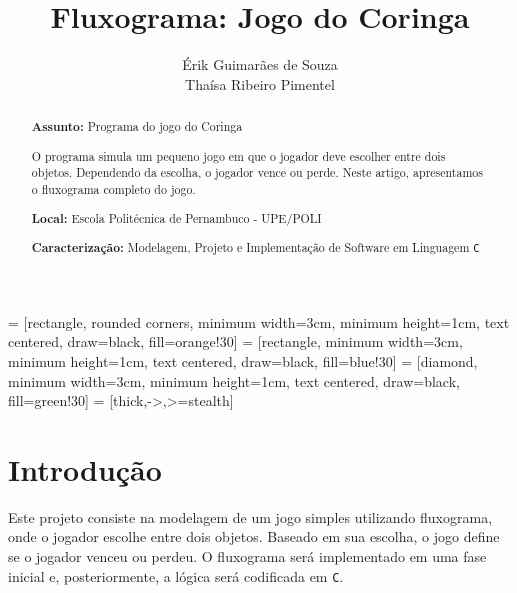 \documentclass[a4paper,12pt]{article} %
\title{Fluxograma: Jogo do Coringa}
\author{Érik Guimarães de Souza \\ Thaísa Ribeiro Pimentel}
\begin{document}
\maketitle

 = [rectangle, rounded corners, minimum width=3cm, minimum height=1cm, text centered, draw=black, fill=orange!30]
 = [rectangle, minimum width=3cm, minimum height=1cm, text centered, draw=black, fill=blue!30]
 = [diamond, minimum width=3cm, minimum height=1cm, text centered, draw=black, fill=green!30]
 = [thick,->,>=stealth]

\begin{abstract}

\textbf{Assunto:} Programa do jogo do Coringa

O programa simula um pequeno jogo em que o jogador deve escolher entre dois objetos. Dependendo da escolha, o jogador vence ou perde. Neste artigo, apresentamos o fluxograma completo do jogo.

\textbf{Local:} Escola Politécnica de Pernambuco - UPE/POLI

\textbf{Caracterização:} Modelagem, Projeto e Implementação de Software em Linguagem \texttt{C}

\end{abstract}

\section{Introdução}

Este projeto consiste na modelagem de um jogo simples utilizando fluxograma, onde o jogador escolhe entre dois objetos. Baseado em sua escolha, o jogo define se o jogador venceu ou perdeu. O fluxograma será implementado em uma fase inicial e, posteriormente, a lógica será codificada em \texttt{C}.

\end{document}
